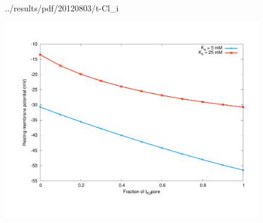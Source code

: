 \begin{figure}
{  {../results/pdf/20120803/t-Cl_i}}
  \subfloat{\hspace{0.50\textwidth}}\\
  \caption{}
  \label{fig:concentrations}
\end{figure}

\clearpage
\begin{landscape}
\begin{figure}
  \centering
  \includegraphics[width=1.0\textwidth]
    {../results/pdf/20120803/I_K_2pore_vs_RMP}
  \caption{}
  \label{fig:I-K-2pore-rmp}
\end{figure}
\end{landscape}

